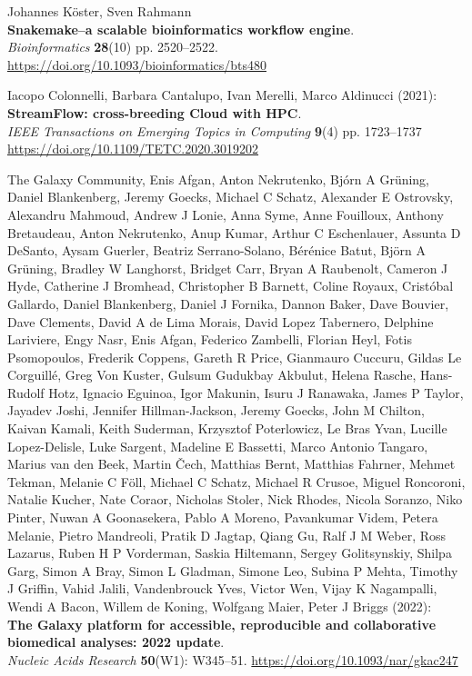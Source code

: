 \documentclass[10pt,letterpaper]{article}
\begin{document}
\begin{thebibliography}{10}
\begin{small}
Johannes Köster, Sven Rahmann \\
\textbf{Snakemake--a scalable bioinformatics workflow engine}.\\
\emph{Bioinformatics} \textbf{28}(10) pp. 2520--2522.\\
\url{https://doi.org/10.1093/bioinformatics/bts480}

Iacopo Colonnelli, Barbara Cantalupo, Ivan Merelli, Marco Aldinucci (2021):\\
\textbf{StreamFlow: cross-breeding Cloud with HPC}.\\
\emph{IEEE Transactions on Emerging Topics in Computing} \textbf{9}(4) pp. 1723--1737\\
\url{https://doi.org/10.1109/TETC.2020.3019202}

The Galaxy Community, Enis Afgan, Anton Nekrutenko, Bjórn A Grüning, Daniel Blankenberg, Jeremy Goecks, Michael C Schatz, Alexander E Ostrovsky, Alexandru Mahmoud, Andrew J Lonie, Anna Syme, Anne Fouilloux, Anthony Bretaudeau, Anton Nekrutenko, Anup Kumar, Arthur C Eschenlauer, Assunta D DeSanto, Aysam Guerler, Beatriz Serrano-Solano, Bérénice Batut, Björn A Grüning, Bradley W Langhorst, Bridget Carr, Bryan A Raubenolt, Cameron J Hyde, Catherine J Bromhead, Christopher B Barnett, Coline Royaux, Cristóbal Gallardo, Daniel Blankenberg, Daniel J Fornika, Dannon Baker, Dave Bouvier, Dave Clements, David A de Lima Morais, David Lopez Tabernero, Delphine Lariviere, Engy Nasr, Enis Afgan, Federico Zambelli, Florian Heyl, Fotis Psomopoulos, Frederik Coppens, Gareth R Price, Gianmauro Cuccuru, Gildas Le Corguillé, Greg Von Kuster, Gulsum Gudukbay Akbulut, Helena Rasche, Hans-Rudolf Hotz, Ignacio Eguinoa, Igor Makunin, Isuru J Ranawaka, James P Taylor, Jayadev Joshi, Jennifer Hillman-Jackson, Jeremy Goecks, John M Chilton, Kaivan Kamali, Keith Suderman, Krzysztof Poterlowicz, Le Bras Yvan, Lucille Lopez-Delisle, Luke Sargent, Madeline E Bassetti, Marco Antonio Tangaro, Marius van den Beek, Martin Čech, Matthias Bernt, Matthias Fahrner, Mehmet Tekman, Melanie C Föll, Michael C Schatz, Michael R Crusoe, Miguel Roncoroni, Natalie Kucher, Nate Coraor, Nicholas Stoler, Nick Rhodes, Nicola Soranzo, Niko Pinter, Nuwan A Goonasekera, Pablo A Moreno, Pavankumar Videm, Petera Melanie, Pietro Mandreoli, Pratik D Jagtap, Qiang Gu, Ralf J M Weber, Ross Lazarus, Ruben H P Vorderman, Saskia Hiltemann, Sergey Golitsynskiy, Shilpa Garg, Simon A Bray, Simon L Gladman, Simone Leo, Subina P Mehta, Timothy J Griffin, Vahid Jalili, Vandenbrouck Yves, Victor Wen, Vijay K Nagampalli, Wendi A Bacon, Willem de Koning, Wolfgang Maier, Peter J Briggs (2022):\\
\textbf{The Galaxy platform for accessible, reproducible and collaborative biomedical analyses: 2022 update}.\\
\emph{Nucleic Acids Research} \textbf{50}(W1): W345--51.
\url{https://doi.org/10.1093/nar/gkac247}


\end{small}
\end{thebibliography}
\end{document}
